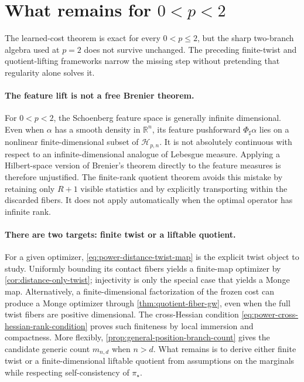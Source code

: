 \documentclass[11pt,a4paper]{article}
\theoremstyle{definition}
\theoremstyle{remark}
\newcommand{\R}{\mathbb R}
\newcommand{\Hcal}{\mathcal H}
\begin{document}
\section{What remains for \texorpdfstring{\(0<p<2\)}{0<p<2}}
\label{sec:open}

The learned-cost theorem is exact for every \(0<p\leq2\), but the sharp
two-branch algebra used at \(p=2\) does not survive unchanged.  The preceding
finite-twist and quotient-lifting frameworks narrow the missing step without
pretending that regularity alone solves it.

\paragraph{The feature lift is not a free Brenier theorem.}
For \(0<p<2\), the Schoenberg feature space is generally infinite
dimensional.  Even when \(\alpha\) has a smooth density in \(\R^n\), its
feature pushforward \(\Phi_\sharp\alpha\) lies on a nonlinear
finite-dimensional subset of \(\Hcal_{p,n}\).  It is not absolutely
continuous with respect to an infinite-dimensional analogue of Lebesgue
measure.  Applying a Hilbert-space version of Brenier's theorem directly to
the feature measures is therefore unjustified.  The finite-rank quotient
theorem avoids this mistake by retaining only \(R+1\) visible statistics and
by explicitly transporting within the discarded fibers.  It does not apply
automatically when the optimal operator has infinite rank.

\paragraph{There are two targets: finite twist or a liftable quotient.}
For a given optimizer, \eqref{eq:power-distance-twist-map} is the explicit
twist object to study.  Uniformly bounding its contact fibers yields a
finite-map optimizer by \cref{cor:distance-only-twist}; injectivity is only
the special case that yields a Monge map.  Alternatively, a
finite-dimensional factorization of the frozen cost can produce a Monge
optimizer through \cref{thm:quotient-fiber-gw}, even when the full twist
fibers are positive dimensional.  The cross-Hessian condition
\eqref{eq:power-cross-hessian-rank-condition} proves such finiteness by local
immersion and compactness.  More flexibly,
\cref{prop:general-position-branch-count} gives the candidate generic count
\(m_{n,d}\) when \(n>d\).  What remains is to derive either finite twist or
a finite-dimensional liftable quotient from assumptions on the marginals
while respecting self-consistency of \(\pi_\star\).
\end{document}
